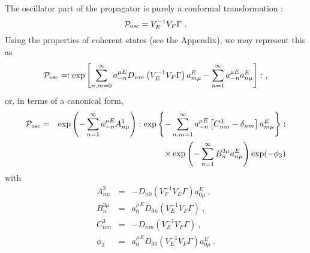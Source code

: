 \documentclass[a4paper,11pt]{article}
\begin{document}
The oscillator part of the propagator is purely a conformal transformation \cite{pw2}:
\begin{equation}
{\cal P}_{\rm osc}=V^{-1}_EV_F\Gamma \ .
\end{equation}
Using the properties of coherent states (see the Appendix), we may represent this as \cite{cg2}
\begin{equation}
{\cal P}_{\rm osc}=:\exp \left[ \sum_{n,m=0}^\infty a^{\mu E}_{-n}D_{nm}\left( V^{-1}_EV_F\Gamma \right) a^E_{m\mu }-\sum_{n=1}^\infty a^{\mu E}_{-n}a^E_{n\mu }\right] :\ ,
\end{equation}
or, in terms of a canonical form,
\begin{eqnarray}
{\cal P}_{\rm osc} & = & \exp \left(-\sum_{n=1}^\infty a_{-n}^{\mu E}A^3_{n\mu }\right) :\exp \left\{ -\sum_{n,m=1}^\infty a^{\mu E}_{-n}\left[ C^3_{nm}-\delta _{nm}\right] a^E_{m\mu }\right\} :\nonumber \\
 & & \times \exp \left( -\sum_{n=1}^\infty B^{3\mu }_na^E_{n\mu }\right) \exp (-\phi _3)
\end{eqnarray}
with
\begin{eqnarray}
A^3_{n\mu } & = & -D_{n0}\left( V^{-1}_FV_E\Gamma \right) a^E_{0\mu }\ ,\\ 
B^{3\mu }_n & = & a^{\mu E}_0D_{0n}\left( V^{-1}_EV_F\Gamma \right) \ ,\\ 
C^3_{nm} & = & -D_{nm}\left( V^{-1}_EV_F\Gamma \right) \ ,\\ 
\phi _3 & = & a^{\mu E}_0D_{00}\left( V^{-1}_EV_F\Gamma \right) a^E_{0\mu }\ .
\end{eqnarray}
\end{document}
